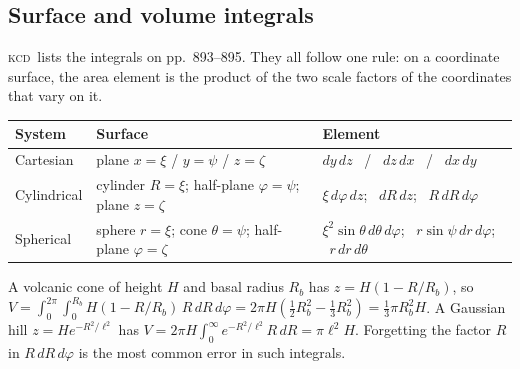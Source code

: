 \documentclass[11pt,letterpaper]{article}
\numberwithin{equation}{section}
\newcommand{\Kundu}{\textnormal{\textsc{kcd}}}   %
\begin{document}
\subsection{Surface and volume integrals}
\Kundu\ lists the integrals on pp.~893--895. They all follow one rule: on a coordinate surface, the area element is the product of
the two scale factors of the coordinates that vary on it.
\begin{center}
\small
\renewcommand{\arraystretch}{1.3}
\begin{tabular}{@{}lll@{}}
\toprule
System & Surface & Element \\ \midrule
Cartesian & plane $x=\xi$ / $y=\psi$ / $z=\zeta$ & $dy\,dz$ \ / \ $dz\,dx$ \ / \ $dx\,dy$ \\
Cylindrical & cylinder $R=\xi$; half-plane $\varphi=\psi$; plane $z=\zeta$ & $\xi\,d\varphi\,dz$; \ $dR\,dz$; \ $R\,dR\,d\varphi$ \\
Spherical & sphere $r=\xi$; cone $\theta=\psi$; half-plane $\varphi=\zeta$ & $\xi^2\sin\theta\,d\theta\,d\varphi$; \ $r\sin\psi\,dr\,d\varphi$; \ $r\,dr\,d\theta$ \\
\bottomrule
\end{tabular}
\end{center}

\begin{worked}\label{we:volumes}
A volcanic cone of height $H$ and basal radius $R_b$ has $z=H(1-R/R_b)$, so
$V=\int_0^{2\pi}\!\int_0^{R_b}H(1-R/R_b)\,R\,dR\,d\varphi=2\pi H\left(\tfrac12R_b^2-\tfrac13R_b^2\right)=\tfrac13\pi R_b^2H$.
A Gaussian hill $z=He^{-R^2/\ell^2}$ has $V=2\pi H\int_0^\infty e^{-R^2/\ell^2}R\,dR=\pi\ell^2H$.
Forgetting the factor $R$ in $R\,dR\,d\varphi$ is the most common error in such integrals.
\end{worked}
\end{document}
